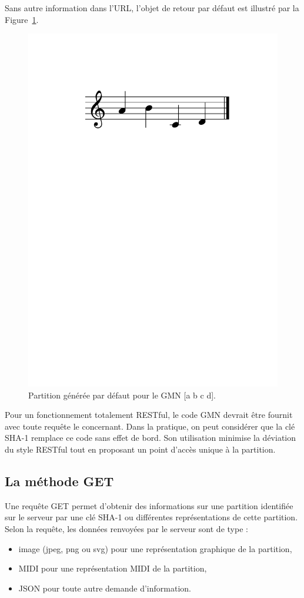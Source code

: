 \documentclass{article}
\begin{document}
Sans autre information dans l'URL, l'objet de retour par défaut est illustré par la Figure~\ref{fig:figure1}.
\begin{figure}[h]
  \centering
    \includegraphics[width=0.65\columnwidth]{figure1}
  \cprotect\caption{\label{fig:figure1}Partition générée par défaut pour le GMN [a b c d].}
\end{figure}

Pour un fonctionnement totalement RESTful, le code GMN devrait être fournit avec toute requête le concernant. Dans la pratique, on peut considérer que la clé SHA-1 remplace ce code sans effet de bord. Son utilisation minimise la déviation du style RESTful tout en proposant un point d'accès unique à la partition. 

\subsection{La méthode GET}\label{subsection:get}
Une requête GET permet d'obtenir des informations sur une partition identifiée sur le serveur par une clé SHA-1 ou différentes représentations de cette partition. 
Selon la requête, les données renvoyées par le serveur sont de type :
\begin{itemize}
\item image (jpeg, png ou svg) pour une représentation graphique de la partition,
\item MIDI pour une représentation MIDI de la partition, 
\item JSON pour toute autre demande d'information.
\end{itemize}
\end{document}
